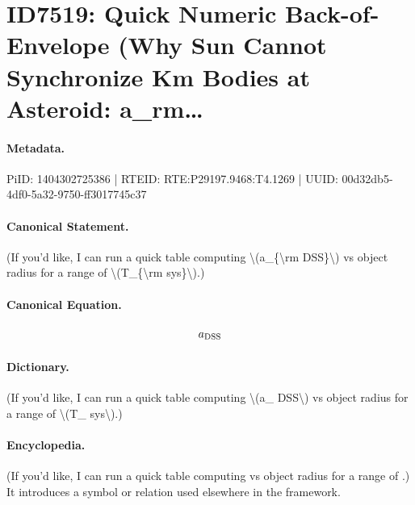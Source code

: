 \section*{ID7519: Quick Numeric Back-of-Envelope (Why Sun Cannot Synchronize Km Bodies at Asteroid: a\_rm…}
\paragraph{Metadata.}
PiID: 1404302725386 | RTEID: RTE:P29197.9468:T4.1269 | UUID: 00d32db5-4df0-5a32-9750-ff3017745c37

\paragraph{Canonical Statement.}
(If you’d like, I can run a quick table computing \textbackslash{}(a\_\{\textbackslash{}rm DSS\}\textbackslash{}) vs object radius for a range of \textbackslash{}(T\_\{\textbackslash{}rm sys\}\textbackslash{}).)

\paragraph{Canonical Equation.}
\[
a_{\rm DSS}
\]

\paragraph{Dictionary.}
(If you’d like, I can run a quick table computing \textbackslash{}(a\_ DSS\textbackslash{}) vs object radius for a range of \textbackslash{}(T\_ sys\textbackslash{}).)

\paragraph{Encyclopedia.}
(If you’d like, I can run a quick table computing vs object radius for a range of .) It introduces a symbol or relation used elsewhere in the framework.
